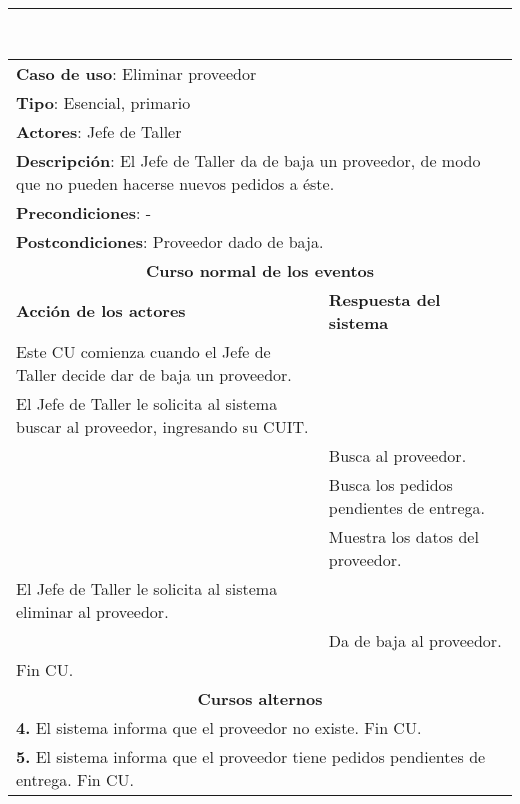     \setcounter{step}{0}

    \noindent\rule{169mm}{0.8mm}\\

	\begin{longtable}{ |p{8cm}|p{8cm}| }
		\hline
		\multicolumn{2}{|p{16cm}|}{\textbf{Caso de uso}: Eliminar proveedor}\\
		\multicolumn{2}{|p{16cm}|}{\textbf{Tipo}: Esencial, primario}\\
		\multicolumn{2}{|p{16cm}|}{\textbf{Actores}: Jefe de Taller}\\
		\multicolumn{2}{|p{16cm}|}{\textbf{Descripción}: El Jefe de Taller da de baja un proveedor, de modo que no pueden hacerse nuevos pedidos a éste.}\\
		\multicolumn{2}{|p{16cm}|}{\textbf{Precondiciones}: -}\\
		\multicolumn{2}{|p{16cm}|}{\textbf{Postcondiciones}: Proveedor dado de baja.}\\
		\hline
		\multicolumn{2}{|c|}{\textbf{Curso normal de los eventos}}\\
		\hline
		\textbf{Acción de los actores} & \textbf{Respuesta del sistema}\\
		\hline
			\inc Este CU comienza cuando el Jefe de Taller decide dar de baja un proveedor.& \\
			\hline
			\inc  El Jefe de Taller le solicita al sistema buscar al proveedor, ingresando su CUIT. & \\
			\hline
			& \inc Busca al proveedor.\\
			\hline
			& \inc Busca los pedidos pendientes de entrega. \\
			\hline
			& \inc Muestra los datos del proveedor. \\
			\hline
			\inc El Jefe de Taller le solicita al sistema eliminar al proveedor.&\\
			\hline
			& \inc Da de baja al proveedor.\\
			\hline
			\inc Fin CU. & \\
		\hline
		\multicolumn{2}{|c|}{\textbf{Cursos alternos}}\\
		\hline
		\multicolumn{2}{|p{16cm}|}{\textbf{4. }El sistema informa que el proveedor no existe. Fin CU.}\\
		\hline
		\multicolumn{2}{|p{16cm}|}{\textbf{5. }El sistema informa que el proveedor tiene pedidos pendientes de entrega. Fin CU.}\\
		\hline	
	\end{longtable}

